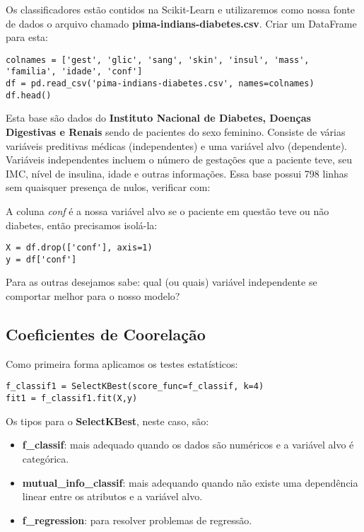 Os classificadores estão contidos na Scikit-Learn e utilizaremos como nossa fonte de dados o arquivo chamado \textbf{pima-indians-diabetes.csv}. Criar um DataFrame para esta:
\begin{lstlisting}
colnames = ['gest', 'glic', 'sang', 'skin', 'insul', 'mass', 'familia', 'idade', 'conf']
df = pd.read_csv('pima-indians-diabetes.csv', names=colnames)
df.head()
\end{lstlisting}

Esta base são dados do \textbf{Instituto Nacional de Diabetes, Doenças Digestivas e Renais} sendo de pacientes do sexo feminino. Consiste de várias variáveis preditivas médicas (independentes) e uma variável alvo (dependente). Variáveis independentes incluem o número de gestações que a paciente teve, seu IMC, nível de insulina, idade e outras informações. Essa base possui 798 linhas sem quaisquer presença de nulos, verificar com:

A coluna \textit{conf} é a nossa variável alvo se o paciente em questão teve ou não diabetes, então precisamos isolá-la:
\begin{lstlisting}
X = df.drop(['conf'], axis=1)
y = df['conf']
\end{lstlisting}

Para as outras desejamos sabe: qual (ou quais) variável independente se comportar melhor para o nosso modelo?

\subsection{Coeficientes de Coorelação}
Como primeira forma aplicamos os testes estatísticos:
\begin{lstlisting}
f_classif1 = SelectKBest(score_func=f_classif, k=4)
fit1 = f_classif1.fit(X,y)
\end{lstlisting}

Os tipos para o \textbf{SelectKBest}, neste caso, são: \vspace{-1em}
\begin{itemize}
	\item \textbf{f\_classif}: mais adequado quando os dados são numéricos e a variável alvo é categórica.
	\item \textbf{mutual\_info\_classif}: mais adequando quando não existe uma dependência linear entre os atributos e a variável alvo.
	\item \textbf{f\_regression}: para resolver problemas de regressão.
\end{itemize}


